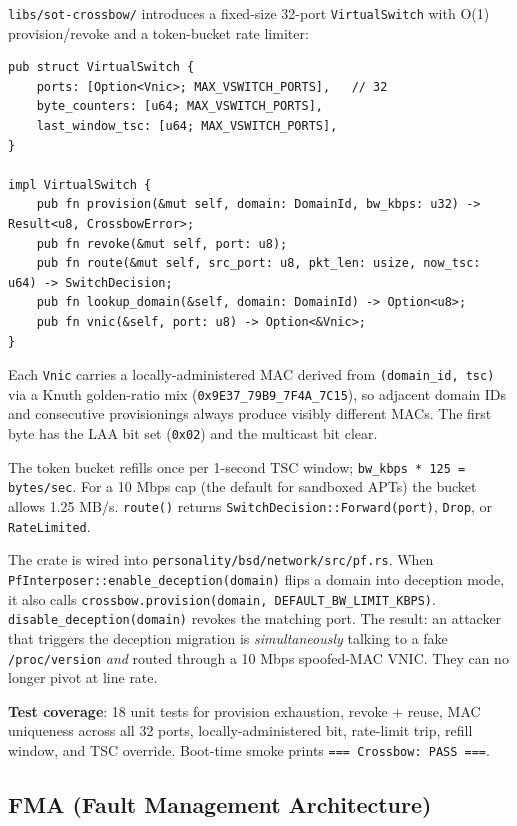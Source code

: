 \documentclass[11pt,a4paper]{article}
\begin{document}
\texttt{libs/sot-crossbow/} introduces a fixed-size 32-port
\texttt{VirtualSwitch} with O(1) provision/revoke and a token-bucket
rate limiter:

\begin{lstlisting}
pub struct VirtualSwitch {
    ports: [Option<Vnic>; MAX_VSWITCH_PORTS],   // 32
    byte_counters: [u64; MAX_VSWITCH_PORTS],
    last_window_tsc: [u64; MAX_VSWITCH_PORTS],
}

impl VirtualSwitch {
    pub fn provision(&mut self, domain: DomainId, bw_kbps: u32) -> Result<u8, CrossbowError>;
    pub fn revoke(&mut self, port: u8);
    pub fn route(&mut self, src_port: u8, pkt_len: usize, now_tsc: u64) -> SwitchDecision;
    pub fn lookup_domain(&self, domain: DomainId) -> Option<u8>;
    pub fn vnic(&self, port: u8) -> Option<&Vnic>;
}
\end{lstlisting}

Each \texttt{Vnic} carries a locally-administered MAC derived from
\texttt{(domain\_id, tsc)} via a Knuth golden-ratio mix
(\texttt{0x9E37\_79B9\_7F4A\_7C15}), so adjacent domain IDs and
consecutive provisionings always produce visibly different MACs.
The first byte has the LAA bit set (\texttt{0x02}) and the multicast
bit clear.

The token bucket refills once per 1-second TSC window;
\texttt{bw\_kbps * 125 = bytes/sec}. For a 10 Mbps cap (the default
for sandboxed APTs) the bucket allows 1.25 MB/s.
\texttt{route()} returns \texttt{SwitchDecision::Forward(port)},
\texttt{Drop}, or \texttt{RateLimited}.

The crate is wired into \texttt{personality/bsd/network/src/pf.rs}.
When \texttt{PfInterposer::enable\_deception(domain)} flips a domain
into deception mode, it also calls
\texttt{crossbow.provision(domain, DEFAULT\_BW\_LIMIT\_KBPS)}.
\texttt{disable\_deception(domain)} revokes the matching port. The
result: an attacker that triggers the deception migration is
\emph{simultaneously} talking to a fake \texttt{/proc/version}
\emph{and} routed through a 10 Mbps spoofed-MAC VNIC. They can no
longer pivot at line rate.

\textbf{Test coverage}: 18 unit tests for provision exhaustion,
revoke + reuse, MAC uniqueness across all 32 ports, locally-administered
bit, rate-limit trip, refill window, and TSC override. Boot-time smoke
prints \verb|=== Crossbow: PASS ===|.

\subsection{FMA (Fault Management Architecture)}
\end{document}
